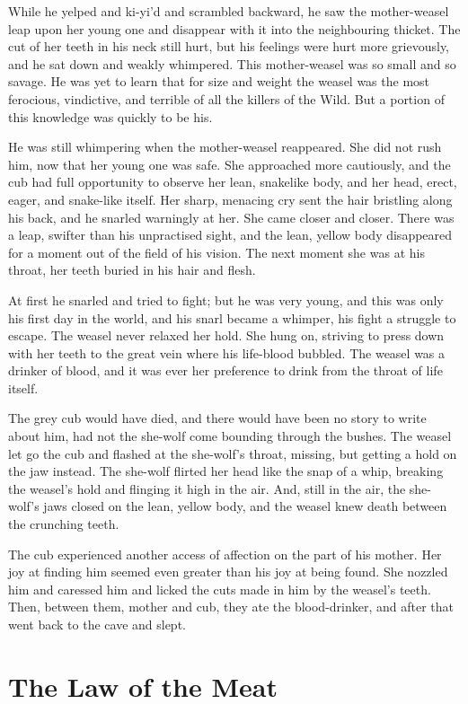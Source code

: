 \documentclass[10pt]{book}
\begin{document}
While he yelped and ki-yi’d and scrambled backward, he saw the
mother-weasel leap upon her young one and disappear with it into the
neighbouring thicket. The cut of her teeth in his neck still hurt, but
his feelings were hurt more grievously, and he sat down and weakly
whimpered. This mother-weasel was so small and so savage. He was yet to
learn that for size and weight the weasel was the most ferocious,
vindictive, and terrible of all the killers of the Wild. But a portion
of this knowledge was quickly to be his.

He was still whimpering when the mother-weasel reappeared. She did not
rush him, now that her young one was safe. She approached more
cautiously, and the cub had full opportunity to observe her lean,
snakelike body, and her head, erect, eager, and snake-like itself. Her
sharp, menacing cry sent the hair bristling along his back, and he
snarled warningly at her. She came closer and closer. There was a leap,
swifter than his unpractised sight, and the lean, yellow body
disappeared for a moment out of the field of his vision. The next
moment she was at his throat, her teeth buried in his hair and flesh.

At first he snarled and tried to fight; but he was very young, and this
was only his first day in the world, and his snarl became a whimper,
his fight a struggle to escape. The weasel never relaxed her hold. She
hung on, striving to press down with her teeth to the great vein where
his life-blood bubbled. The weasel was a drinker of blood, and it was
ever her preference to drink from the throat of life itself.

The grey cub would have died, and there would have been no story to
write about him, had not the she-wolf come bounding through the bushes.
The weasel let go the cub and flashed at the she-wolf’s throat,
missing, but getting a hold on the jaw instead. The she-wolf flirted
her head like the snap of a whip, breaking the weasel’s hold and
flinging it high in the air. And, still in the air, the she-wolf’s jaws
closed on the lean, yellow body, and the weasel knew death between the
crunching teeth.

The cub experienced another access of affection on the part of his
mother. Her joy at finding him seemed even greater than his joy at
being found. She nozzled him and caressed him and licked the cuts made
in him by the weasel’s teeth. Then, between them, mother and cub, they
ate the blood-drinker, and after that went back to the cave and slept.

\chapter{The Law of the Meat}
\end{document}
